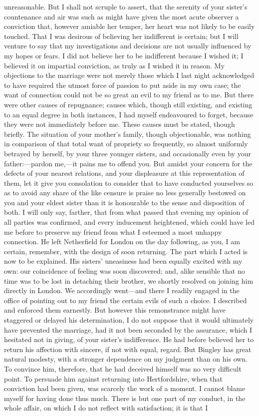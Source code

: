 \documentclass[12pt,openright]{book}
\begin{document}
unreasonable. But I shall not scruple to assert, that the serenity of your sister’s countenance and air was such as might have given the most acute observer a conviction that, however amiable her temper, her heart was not likely to be easily touched. That I was desirous of believing her indifferent is certain; but I will venture to say that my investigations and decisions are not usually influenced by my hopes or fears. I did not believe her to be indifferent because I wished it; I believed it on impartial conviction, as truly as I wished it in reason. My objections to the marriage were not merely those which I last night acknowledged to have required the utmost force of passion to put aside in my own case; the want of connection could not be so great an evil to my friend as to me. But there were other causes of repugnance; causes which, though still existing, and existing to an equal degree in both instances, I had myself endeavoured to forget, because they were not immediately before me. These causes must be stated, though briefly. The situation of your mother’s family, though objectionable, was nothing in comparison of that total want of propriety so frequently, so almost uniformly betrayed by herself, by your three younger sisters, and occasionally even by your father:—pardon me,—it pains me to offend you. But amidst your concern for the defects of your nearest relations, and your displeasure at this representation of them, let it give you consolation to consider that to have conducted yourselves so as to avoid any share of the like censure is praise no less generally bestowed on you and your eldest sister than it is honourable to the sense and disposition of both. I will only say, farther, that from what passed that evening my opinion of all parties was confirmed, and every inducement heightened, which could have led me before to preserve my friend from what I esteemed a most unhappy connection. He left Netherfield for London on the day following, as you, I am certain, remember, with the design of soon returning. The part which I acted is now to be explained. His sisters’ uneasiness had been equally excited with my own: our coincidence of feeling was soon discovered; and, alike sensible that no time was to be lost in detaching their brother, we shortly resolved on joining him directly in London. We accordingly went—and there I readily engaged in the office of pointing out to my friend the certain evils of such a choice. I described and enforced them earnestly. But however this remonstrance might have staggered or delayed his determination, I do not suppose that it would ultimately have prevented the marriage, had it not been seconded by the assurance, which I hesitated not in giving, of your sister’s indifference. He had before believed her to return his affection with sincere, if not with equal, regard. But Bingley has great natural modesty, with a stronger dependence on my judgment than on his own. To convince him, therefore, that he had deceived himself was no very difficult point. To persuade him against returning into Hertfordshire, when that conviction had been given, was scarcely the work of a moment. I cannot blame myself for having done thus much. There is but one part of my conduct, in the whole affair, on which I do not reflect with satisfaction; it is that I 
\end{document}
